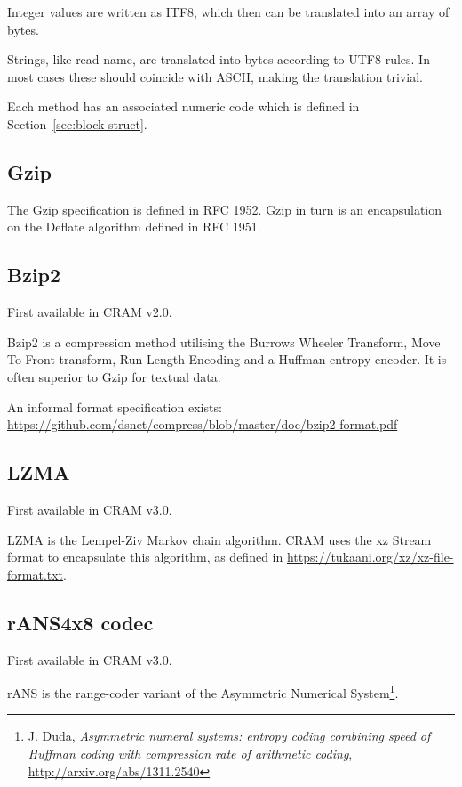 \documentclass[a4paper]{article}
\begin{document}
Integer values are written as ITF8, which then can be translated into an array 
of bytes. 

Strings, like read name, are translated into bytes according to UTF8 rules. In 
most cases these should coincide with ASCII, making the translation trivial.

Each method has an associated numeric code which is defined in Section~\ref{sec:block-struct}.

\subsection{\textbf{Gzip}}

The Gzip specification is defined in RFC 1952.
Gzip in turn is an encapsulation on the Deflate algorithm defined in RFC 1951.

\subsection{\textbf{Bzip2}}

First available in CRAM v2.0.

Bzip2 is a compression method utilising the Burrows Wheeler Transform, Move To Front transform, Run Length Encoding and a Huffman entropy encoder. 
It is often superior to Gzip for textual data.

An informal format specification exists:\\
\url{https://github.com/dsnet/compress/blob/master/doc/bzip2-format.pdf}

\subsection{\textbf{LZMA}}

First available in CRAM v3.0.

LZMA is the Lempel-Ziv Markov chain algorithm.
CRAM uses the xz Stream format to encapsulate this algorithm, as defined in \url{https://tukaani.org/xz/xz-file-format.txt}.

\subsection{\textbf{rANS4x8 codec}}

First available in CRAM v3.0.

rANS is the range-coder variant of the Asymmetric Numerical
System\footnote{J. Duda, \textit{Asymmetric numeral systems: entropy
    coding combining speed of Huffman coding with compression rate of
    arithmetic coding}, \url{http://arxiv.org/abs/1311.2540}}.
\end{document}
